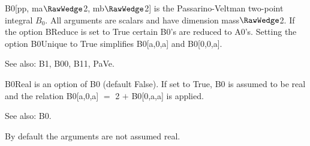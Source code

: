 
B0[pp, ma\(\RawWedge\)2, mb\(\RawWedge\)2] is the Passarino-Veltman two-point integral \({B_0}\). All arguments are scalars and have dimension mass\(\RawWedge\)2.
If the option BReduce is set to True certain B0's are reduced to A0's.
  Setting the option B0Unique to True simplifies B0[a,0,a] and B0[0,0,a].



See also:  B1, B00, B11, PaVe.













B0Real is an option of B0 (default False). If set to True, B0 is assumed to be real and the relation B0[a,0,a] \(=\) 2 \(+\) B0[0,a,a] {
  }is applied.

See also: B0.


By default the arguments are not assumed real.




